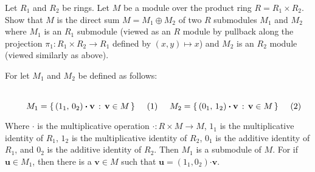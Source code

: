 \documentclass[crop=false,class=article]{standalone}                       %
\begin{document}
        \begin{problem}
            Let $R_{1}$ and $R_{2}$ be rings. Let $M$ be a module over
            the product ring $R=R_{1}\times{R}_{2}$. Show that $M$ is
            the direct sum $M=M_{1}\oplus{M}_{2}$ of two
            $R$ submodules $M_{1}$ and $M_{2}$ where $M_{1}$ is an
            $R_{1}$ submodule (viewed as an $R$ module by pullback along
            the projection $\pi_{1}:R_{1}\times{R}_{2}\rightarrow{R}_{1}$
            defined by $(x,y)\mapsto{x}$) and $M_{2}$ is an
            $R_{2}$ module (viewed similarly as above).
        \end{problem}
        \begin{solution}
            For let $M_{1}$ and $M_{2}$ be defined as follows:
            \par
            \begin{subequations}
                \begin{minipage}[b]{0.49\textwidth}
                    \begin{equation}
                        M_{1}=\{\,(1_{1},\,0_{2})
                                \boldsymbol{\cdot}\mathbf{v}\,:\,
                                \mathbf{v}\in{M}\,\}
                    \end{equation}
                \end{minipage}
                \hfill
                \begin{minipage}[b]{0.49\textwidth}
                    \begin{equation}
                        M_{2}=\{\,(0_{1},\,1_{2})
                                \boldsymbol{\cdot}\mathbf{v}\,:\,
                                \mathbf{v}\in{M}\,\}
                    \end{equation}
                \end{minipage}
            \end{subequations}
            \par\vspace{2.5ex}
            Where $\boldsymbol{\cdot}$ is the multiplicative operation
            $\boldsymbol{\cdot}:R\times{M}\rightarrow{M}$,
            $1_{1}$ is the multiplicative identity of $R_{1}$,
            $1_{2}$ is the multiplicative identity of $R_{2}$,
            $0_{1}$ is the additive identity of $R_{1}$, and
            $0_{2}$ is the additive identity of $R_{2}$. Then
            $M_{1}$ is a submodule of $M$. For if $\mathbf{u}\in{M}_{1}$,
            then there is a $\mathbf{v}\in{M}$ such that
            $\mathbf{u}=(1_{1},0_{2})\boldsymbol{\cdot}\mathbf{v}$.

\end{solution}
\end{document}
